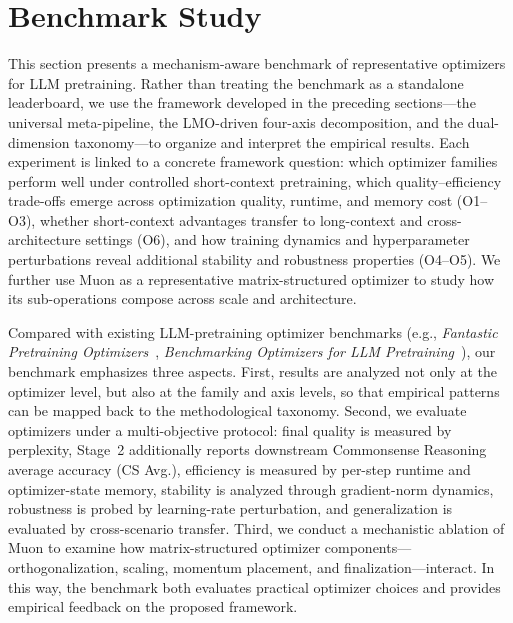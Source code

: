 \section{Benchmark Study}
\label{sec:benchmark}

This section presents a mechanism-aware benchmark of representative optimizers
for LLM pretraining. Rather than treating the benchmark as a standalone
leaderboard, we use the framework developed in the preceding sections---the
universal meta-pipeline, the LMO-driven four-axis decomposition, and the
dual-dimension taxonomy---to organize and interpret the empirical results.
Each experiment is linked to a concrete framework question: which optimizer
families perform well under controlled short-context pretraining, which
quality--efficiency trade-offs emerge across optimization quality, runtime,
and memory cost (O1--O3), whether short-context advantages transfer to
long-context and cross-architecture settings (O6), and how training dynamics
and hyperparameter perturbations reveal additional stability and robustness
properties (O4--O5). We further use Muon as a representative
matrix-structured optimizer to study how its sub-operations compose across
scale and architecture.


Compared with existing LLM-pretraining optimizer benchmarks
(e.g., \emph{Fantastic Pretraining Optimizers}~\cite{wen2025fantastic},
\emph{Benchmarking Optimizers for LLM Pretraining}~\cite{semenov2025benchmarking}),
our benchmark emphasizes three aspects. First, results are analyzed not only at
the optimizer level, but also at the family and axis levels, so that empirical
patterns can be mapped back to the methodological taxonomy. Second, we evaluate
optimizers under a multi-objective protocol: final quality is measured by
perplexity, Stage~2 additionally reports downstream Commonsense Reasoning
average accuracy (CS Avg.), efficiency is measured by per-step runtime and
optimizer-state memory, stability is analyzed through gradient-norm dynamics,
robustness is probed by learning-rate perturbation, and generalization is
evaluated by cross-scenario transfer. Third, we conduct a mechanistic ablation
of Muon to examine how matrix-structured optimizer
components---orthogonalization, scaling, momentum placement, and
finalization---interact. In this way, the benchmark both evaluates practical
optimizer choices and provides empirical feedback on the proposed framework.



